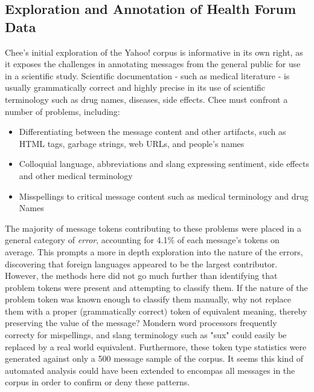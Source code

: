 \documentclass[twoside,11pt]{article}
\begin{document}
\subsection{Exploration and Annotation of Health Forum Data}
Chee's initial exploration of the Yahoo! corpus is informative in its own right, as it exposes the challenges in annotating messages from the general public for use in a scientific study. Scientific documentation - such as medical literature - is usually grammatically correct and highly precise in its use of scientific terminology such as drug names, diseases, side effects. Chee must confront a number of problems, including:
\begin{itemize}
  \item Differentiating between the message content and other artifacts, such as HTML tags, garbage strings, web URLs, and people's names
  \item Colloquial language, abbreviations and slang expressing sentiment, side effects and other medical terminology
  \item Misspellings to critical message content such as medical terminology and drug Names
\end{itemize}

The majority of message tokens contributing to these problems were placed in a general category of \textit{error}, accounting for 4.1\% of each message's tokens on average. This prompts a more in depth exploration into the nature of the errors, discovering that foreign languages appeared to be the largest contributor. However, the methods here did not go much further than identifying that problem tokens were present and attempting to classify them. If the nature of the problem token was known enough to classify them manually, why not replace them with a proper (grammatically correct) token of equivalent meaning, thereby preserving the value of the message? Mondern word processors frequently correcty for mispellings, and slang terminology such as "sux" could easily be replaced by a real world equivalent. Furthermore, these token type statistics were generated against only a 500 message sample of the corpus. It seems this kind of automated analysis could have been extended to encompas all messages in the corpus in order to confirm or deny these patterns.
\end{document}
